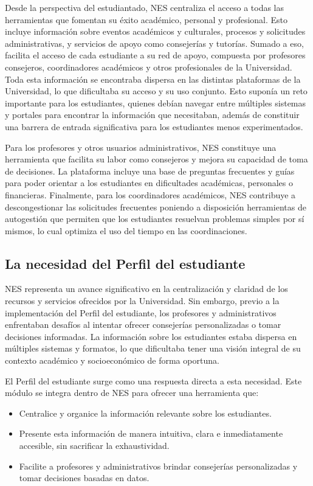 Desde la perspectiva del estudiantado, \gls{NES} centraliza el acceso a todas las herramientas que fomentan su éxito académico, personal y profesional. Esto incluye información sobre eventos académicos y culturales, procesos y solicitudes administrativas, y servicios de apoyo como consejerías y tutorías. Sumado a eso, facilita el acceso de cada estudiante a su red de apoyo, compuesta por profesores consejeros, coordinadores académicos y otros profesionales de la Universidad. Toda esta información se encontraba dispersa en las distintas plataformas de la Universidad, lo que dificultaba su acceso y su uso conjunto. Esto suponía un reto importante para los estudiantes, quienes debían navegar entre múltiples sistemas y portales para encontrar la información que necesitaban, además de constituir una barrera de entrada significativa para los estudiantes menos experimentados.

Para los profesores y otros usuarios administrativos, \gls{NES} constituye una herramienta que facilita su labor como consejeros y mejora su capacidad de toma de decisiones. La plataforma incluye una base de preguntas frecuentes y guías para poder orientar a los estudiantes en dificultades académicas, personales o financieras. Finalmente, para los coordinadores académicos, \gls{NES} contribuye a descongestionar las solicitudes frecuentes poniendo a disposición herramientas de autogestión que permiten que los estudiantes resuelvan problemas simples por sí mismos, lo cual optimiza el uso del tiempo en las coordinaciones.

\subsection{La necesidad del Perfil del estudiante}

\gls{NES} representa un avance significativo en la centralización y claridad de los recursos y servicios ofrecidos por la Universidad. Sin embargo, previo a la implementación del Perfil del estudiante, los profesores y administrativos enfrentaban desafíos al intentar ofrecer consejerías personalizadas o tomar decisiones informadas. La información sobre los estudiantes estaba dispersa en múltiples sistemas y formatos, lo que dificultaba tener una visión integral de su contexto académico y socioeconómico de forma oportuna.

El Perfil del estudiante surge como una respuesta directa a esta necesidad. Este módulo se integra dentro de \gls{NES} para ofrecer una herramienta que:
\begin{itemize}
	\item Centralice y organice la información relevante sobre los estudiantes.
	\item Presente esta información de manera intuitiva, clara e inmediatamente accesible, sin sacrificar la exhaustividad.
	\item Facilite a profesores y administrativos brindar consejerías personalizadas y tomar decisiones basadas en datos.
\end{itemize}

